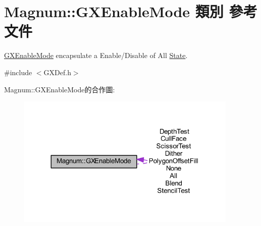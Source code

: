 \hypertarget{class_magnum_1_1_g_x_enable_mode}{}\section{Magnum\+:\+:G\+X\+Enable\+Mode 類別 參考文件}
\label{class_magnum_1_1_g_x_enable_mode}


\hyperlink{class_magnum_1_1_g_x_enable_mode}{G\+X\+Enable\+Mode} encapsulate a Enable/\+Disable of All \hyperlink{class_magnum_1_1_state}{State}.  




{\ttfamily \#include $<$G\+X\+Def.\+h$>$}



Magnum\+:\+:G\+X\+Enable\+Mode的合作圖\+:\nopagebreak
\begin{figure}[H]
\begin{center}
\leavevmode
\includegraphics[width=299pt]{class_magnum_1_1_g_x_enable_mode__coll__graph}
\end{center}
\end{figure}
